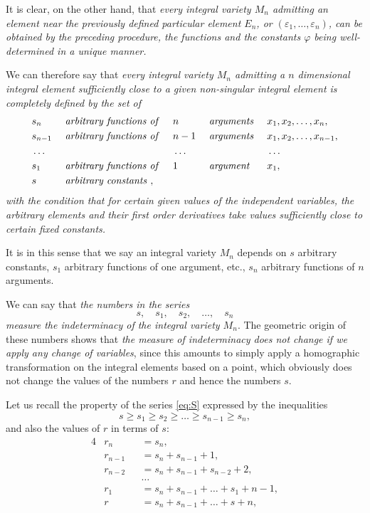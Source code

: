 \documentclass[leqno,11pt]{book}
\makeatletter
\theoremstyle{shape1}
\theoremstyle{shapesmall}
\let\old@phi\phi
\let\old@varphi\varphi
\let\old@epsilon\epsilon
\let\old@varepsilon\varepsilon
\let\phi\old@varphi
\let\varphi\old@phi
\let\epsilon\old@varepsilon
\let\varepsilon\old@epsilon
\makeatother
\begin{document}
It is clear, on the other hand, that \emph{every integral variety $M_{n}$ admitting an element near the previously defined particular element $E_{n}$, or $(\epsilon_{1},\dots,\epsilon_{n})$, can be obtained by the preceding procedure, the functions and the constants $\phi$ being well-determined in a unique manner.}

We can therefore say that \emph{every integral variety $M_{n}$ admitting a $n$ dimensional integral element sufficiently close to a given non-singular integral element is completely defined by the set of}
\begin{alignat*}{10}
  &s_{n}&&\text{ \emph{arbitrary functions of} }&&n&&\text{ \emph{arguments} }&&x_{1},x_{2},\dots,x_{n},\\
  &s_{n-1}&&\text{ \emph{arbitrary functions of} }&&n-1&&\text{ \emph{arguments} }&&x_{1},x_{2},\dots,x_{n-1},\\
  &\dots&&&&\dots&&&&\dots\\
  &s_{1}&&\text{ \emph{arbitrary functions of} }&&1&&\text{ \emph{argument} }&&x_{1},\\
  &s&&\text{ \emph{arbitrary constants} },
\end{alignat*}
\emph{with the condition that for certain given values of the independent variables, the arbitrary elements and their first order derivatives take values sufficiently close to certain fixed constants.}

It is in this sense that we say an integral variety $M_{n}$ depends on $s$ arbitrary constants, $s_{1}$ arbitrary functions of one argument, etc., $s_{n}$ arbitrary functions of $n$ arguments.

We can say that \emph{the numbers in the series}
\begin{equation}
  \label{eq:S}\tag{S}
  s,\quad s_{1},\quad s_{2},\quad \dots,\quad s_{n}
\end{equation}
\emph{measure the indeterminacy of the integral variety $M_{n}$}. The geometric origin of these numbers shows that \emph{the measure of indeterminacy does not change if we apply any change of variables}, since this amounts to simply apply a homographic transformation on the integral elements based on a point, which obviously does not change the values of the numbers $r$ and hence the numbers $s$.

Let us recall the property of the series \eqref{eq:S} expressed by the inequalities
\[
s\ge s_{1}\ge s_{2}\ge \dots \ge s_{n-1}\ge s_{n},
\]
and also the values of $r$ in terms of $s$:
\begin{alignat*}{4}
  &r_{n}&&=s_{n},\\
  &r_{n-1}&&=s_{n}+s_{n-1}+1,\\
  &r_{n-2}&&=s_{n}+s_{n-1}+s_{n-2}+2,\\
  &&&\dots\\
  &r_{1}&&=s_{n}+s_{n-1}+\dots+s_{1}+n-1,\\
  &r&&=s_{n}+s_{n-1}+\dots+s+n,
\end{alignat*}
\end{document}
